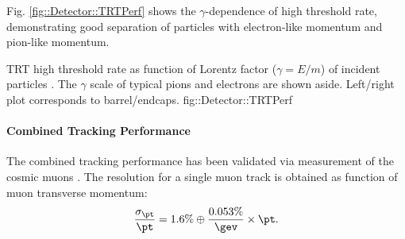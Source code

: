 Fig. \ref{fig::Detector::TRTPerf} shows the $\gamma$-dependence of high threshold rate, demonstrating good separation of particles with electron-like momentum and pion-like momentum.

{TRT high threshold rate as function of Lorentz factor ($\gamma=E/m$) of incident particles \cite{TRTPub}.
The $\gamma$ scale of typical pions and electrons are shown aside. Left/right plot corresponds to barrel/endcaps.}
{fig::Detector::TRTPerf}


\paragraph{Combined Tracking Performance}
The combined tracking performance has been validated via measurement of the cosmic muons \cite{ATLAScosmicPerf}. 
The resolution for a single muon track is obtained as function of muon transverse momentum: 
\begin{align}
\frac{\sigma_{\pt}}{\pt} = 1.6\% \oplus \frac{0.053\%}{\gev}\times \pt.  \label{eq::Detector::perf_ID}
\end{align}



